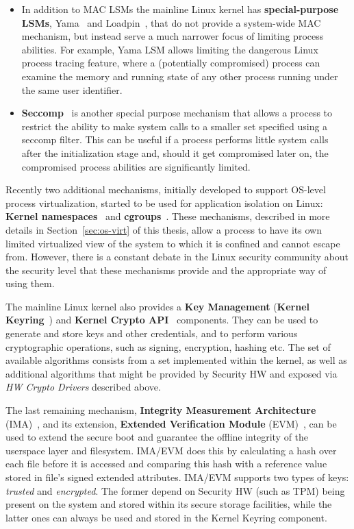 \begin{itemize}
	\item In addition to MAC LSMs the mainline Linux kernel has \textbf{special-purpose LSMs}, Yama~\cite{yama} and Loadpin~\cite{loadpin}, that do not provide a system-wide MAC mechanism, but instead serve a much narrower focus of limiting process abilities. For example, Yama LSM allows limiting the dangerous Linux process tracing feature, where a (potentially compromised) process can examine the memory and running state of any other process running under the same user identifier. 
	\item \textbf{Seccomp}~\cite{seccomp2016} is another special purpose mechanism that allows a process to restrict the ability to make system calls to a smaller set specified using a seccomp filter. This can be useful if a process performs little system calls after the initialization stage and, should it get compromised later on, the compromised process abilities are significantly limited.
\end{itemize} 

Recently two additional mechanisms, initially developed to support OS-level process virtualization, started to be used for application isolation on Linux: \textbf{Kernel namespaces}~\cite{biederman2006} and \textbf{cgroups}~\cite{cgroupsv2}. These mechanisms, described in more details in Section~\ref{sec:os-virt} of this thesis, allow a process to have its own limited virtualized view of the system to which it is confined and cannot escape from. However, there is a constant debate in the Linux security community about the security level that these mechanisms provide and the appropriate way of using them.   

The mainline Linux kernel also provides a \textbf{Key Management} (\textbf{Kernel Keyring}~\cite{keyrings}) and \textbf{Kernel Crypto API}~\cite{kernelcryptoapi} components. They can be used to generate and store keys and other credentials, and to perform various cryptographic operations, such as signing, encryption, hashing etc. The set of available algorithms consists from a set implemented within the kernel, as well as additional algorithms that might be provided by Security HW and exposed via \textit{HW Crypto Drivers} described above.

The last remaining mechanism, \textbf{Integrity Measurement Architecture} (IMA)~\cite{ima}, and its extension, \textbf{Extended Verification Module} (EVM)~\cite{ima}, can be used to extend the secure boot and guarantee the offline integrity of the userspace layer and filesystem. IMA/EVM does this by calculating a hash over each file before it is accessed and comparing this hash with a reference value stored in file's signed extended attributes. IMA/EVM supports two types of keys: \textit{trusted} and \textit{encrypted}. The former depend on Security HW (such as TPM) being present on the system and stored within its secure storage facilities, while the latter ones can always be used and stored in the Kernel Keyring component. 

